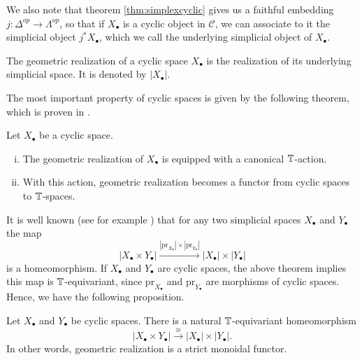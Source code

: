 We also note that theorem \ref{thm:simplexcyclic} gives us 
a faithful embedding $j:\Delta^{op}\to \Lambda^{op}$,
so that if $X_\bullet$ is a cyclic object in $\mathcal{C}$,
we can associate to it the simplicial object $j^\ast X_\bullet$,
which we call the underlying simplicial object of $X_\bullet$.
\begin{mydef}
The geometric realization of a cyclic space $X_\bullet$
is the realization of its underlying simplicial space. It is denoted by $|X_\bullet|$.
\end{mydef}
%
The most important property of cyclic spaces is given by the following theorem,
which is proven in \cite[Theorem~7.1.4, \pno~229]{loday}.
\begin{thm}\label{thm:cyclicrealization}
Let $X_\bullet$ be a cyclic space.
\begin{enumerate}[(i)]
\item The geometric realization of $X_\bullet$ is equipped with a canonical
$\mathbb{T}$-action.
\item With this action, geometric realization becomes a functor
from cyclic spaces to $\mathbb{T}$-spaces.
\end{enumerate}
\end{thm}
%
It is well known
(see for example \cite[Theorem~11.5, \pno~103]{mayloopspaces})
that for any two simplicial spaces $X_\bullet$ and  $Y_\bullet$ the map
\begin{equation}\label{eq:realizationproduct}
|X_\bullet\times Y_\bullet | \xrightarrow{|\mathrm{pr}_{X_\bullet}|\times
|\mathrm{pr}_{Y_\bullet}|} |X_\bullet|\times |Y_\bullet |
\end{equation}
is a homeomorphism. If $X_\bullet$ and $Y_\bullet$ are cyclic spaces,
the above theorem implies this map is $\mathbb{T}$-equivariant, since $\mathrm{pr}_{X_\bullet}$ and 
$\mathrm{pr}_{Y_\bullet}$ are morphisms of cyclic spaces. Hence,
we have the following proposition.

\begin{prop}\label{prop:cyclicproduct}
Let $X_\bullet$ and $Y_\bullet$ be cyclic spaces. There is a natural 
$\mathbb{T}$-equivariant homeomorphism
$$
\left| X_\bullet \times Y_\bullet \right|\xrightarrow{\cong}
\left| X_\bullet\right| \times \left| Y_\bullet \right|.$$
In other words, geometric realization is a strict monoidal functor.
\end{prop}

